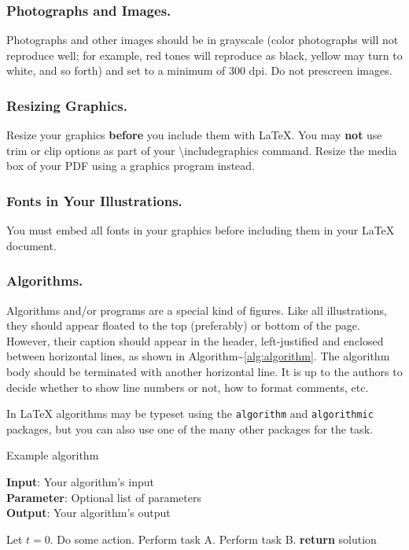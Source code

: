 \subsubsection{Photographs and Images.}

Photographs and other images should be in grayscale (color photographs
will not reproduce well; for example, red tones will reproduce as black,
yellow may turn to white, and so forth) and set to a minimum of 300 dpi.
Do not prescreen images.

\subsubsection{Resizing Graphics.}

Resize your graphics \textbf{before} you include them with LaTeX. You
may \textbf{not} use trim or clip options as part of your
\textbackslash includegraphics command. Resize the media box of your PDF
using a graphics program instead.

\subsubsection{Fonts in Your Illustrations.}

You must embed all fonts in your graphics before including them in your
LaTeX document.

\subsubsection{Algorithms.}

Algorithms and/or programs are a special kind of figures. Like all
illustrations, they should appear floated to the top (preferably) or
bottom of the page. However, their caption should appear in the header,
left-justified and enclosed between horizontal lines, as shown in
Algorithm\textasciitilde{}\ref{alg:algorithm}. The algorithm body should
be terminated with another horizontal line. It is up to the authors to
decide whether to show line numbers or not, how to format comments, etc.

In \LaTeX{} algorithms may be typeset using the \texttt{algorithm} and
\texttt{algorithmic} packages, but you can also use one of the many
other packages for the task.

\begin{algorithm}[tb]
\caption{Example algorithm}
\label{alg:algorithm}
\textbf{Input}: Your algorithm's input\\
\textbf{Parameter}: Optional list of parameters\\
\textbf{Output}: Your algorithm's output
\begin{algorithmic}[1] %
\STATE Let $t=0$.
\STATE Do some action.
\STATE Perform task A.
\ELSE
\STATE Perform task B.
\ENDIF
\ENDWHILE
\STATE \textbf{return} solution
\end{algorithmic}
\end{algorithm}


